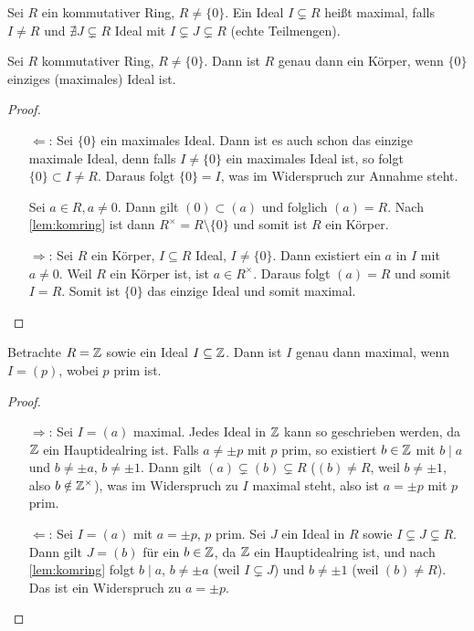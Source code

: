 \documentclass[12pt,a4paper]{scrartcl}
\begin{document}
\begin{defi}
	Sei $R$ ein kommutativer Ring, $R\neq \{0\}$. Ein Ideal $I\subsetneq R$ heißt maximal, falls $I\neq R$ und $\nexists J\subsetneq R$ Ideal mit $I\subsetneq J\subsetneq R$ (echte Teilmengen).
\end{defi}
\begin{lem}
	Sei $R$ kommutativer Ring, $R\neq \{0\}$. Dann ist $R$ genau dann ein Körper, wenn $\lbrace 0 \rbrace$ einziges (maximales) Ideal ist.
\end{lem}
\begin{proof}
	\leavevmode
	\begin{itemize}
		\item[\glqq $\Leftarrow$\grqq:] Sei $\{0\}$ ein maximales Ideal. Dann ist es auch schon das einzige maximale Ideal, denn falls $I\neq \{0\}$ ein maximales Ideal ist, so folgt $\{0\}\subset I\neq R$. Daraus folgt $\{0\} = I$, was im Widerspruch zur Annahme steht.
		
		Sei $a\in R, a\neq 0$. Dann gilt $(0) \subset (a)$ und folglich $(a) = R$. Nach \cref{lem:komring} ist dann $R^{\times} = R\setminus\{0\}$ und somit ist $R$ ein Körper.
		\item[\glqq $\Rightarrow$\grqq:] Sei $R$ ein Körper, $I\subseteq R$ Ideal, $I\neq \{0\}$. Dann existiert ein $a$ in $I$ mit $ a\neq 0$. Weil $R$ ein Körper ist, ist $a\in R^{\times}$. Daraus folgt $(a) = R$ und somit $I = R$. Somit ist $\{0\}$ das einzige Ideal und somit maximal.
	\end{itemize}
\end{proof}

\begin{bsp}
	Betrachte $R = \mathbb Z$ sowie ein Ideal $I\subseteq \mathbb Z$. Dann ist $I$ genau dann maximal, wenn $I = (p)$, wobei $p$ prim ist.
	\begin{proof}
		\leavevmode
		\begin{itemize}
			\item[\glqq $\Rightarrow$\grqq:] Sei $I = (a)$ maximal. Jedes Ideal in $\mathbb Z$ kann so geschrieben werden, da $\mathbb Z$ ein Hauptidealring ist. Falls $a\neq \pm p$ mit $p$ prim, so existiert $b\in \mathbb Z$ mit $b\mid a$ und $b\neq \pm a$, $b\neq  \pm 1$.
			Dann gilt $(a)\subsetneq (b)\subsetneq R$ ($(b)\neq R$, weil $b\neq \pm 1$, also $b\notin \mathbb Z^{\times}$), was im Widerspruch zu $I$ maximal steht, also ist $a  = \pm p$ mit $p$ prim.
			
			\item[\glqq $\Leftarrow$\grqq:] Sei $I = (a)$ mit $a = \pm p$, $p$ prim. Sei $J$ ein Ideal in $R$ sowie $I \subsetneq J\subsetneq R$. Dann gilt $J = (b)$ für ein $b\in\mathbb Z$, da $\mathbb Z$ ein Hauptidealring ist, und nach \cref{lem:komring} folgt $b\mid a$, $b\neq \pm a$ (weil $I\subsetneq J$) und $b \neq \pm 1$ (weil $(b)\neq R$). Das ist ein Widerspruch zu $a = \pm p$.
		\end{itemize}
	\end{proof}
\end{bsp}
\end{document}
